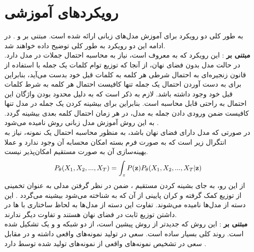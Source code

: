 \section{رویکردهای آموزشی}
به طور کلی دو رویکرد برای آموزش مدل‌های زبانی ارائه شده است. مبتنی بر \likelihood{} و 
.
در ادامه این دو رویکرد به طور کلی توضیح داده خواهند شد.
\\
{\bf مبتنی بر \likelihood{}}:
این رویکرد که به 
معروف است، نیاز به محاسبه احتمال جملات در مدل دارد. در حالت مدل بدون فضای نهان، از آنجا که توزیع توام کلمات یک جمله با استفاده از قانون زنجیره‌ای به احتمال شرطی هر کلمه به کلمات قبل خود بدست می‌آید، بنابراین برای به دست آوردن احتمال یک جمله تنها کافیست احتمال هر کلمه به شرط کلمات قبل خود وجود داشته باشد. لازم به ذکر است که به دلیل محدود بودن واژگان این احتمال به راحتی قابل محاسبه است. بنابراین برای بیشینه کردن \likelihood{} یک جمله در مدل تنها کافیست ضمن ورودی دادن جمله به مدل، در هر زمان احتمال کلمه بعدی بیشینه گردد. به این روش آموزش مدل زبانی روش 
نامیده می‌شود \cite{teacher_force}.
\\
در صورتی که مدل دارای فضای نهان باشد، به منظور محاسبه احتمال یک نمونه، نیاز به انتگرال زیر است که به صورت فرم بسته امکان محسابه آن وجود ندارد و عملا بهینه‌سازی آن به صورت مستقیم امکان‌پذیر نیست.
\begin{align}
P_\theta(X_1, X_2, ... , X_T) = \int_z P({\bf z})P_\theta(X_1, X_2, ... , X_T|{\bf z})
\end{align}
 از این رو، به جای بشینه کردن مستقیم \likelihood{}، ضمن در نظر گرفتن مدلی به عنوان تخمینی از توزیع
 کمک گرفته و کران پایینی از آن که به  شناخته می‌شود بیشینه می‌گردد \cite{vae}. این دسته از مدل‌ها 
نامیده می‌شوند. تفاوت این دسته از مدل‌ها به لحاظ ساختاری با 
ها
در داشتن توزیع ثابت در فضای نهان هستند و تفاوت دیگر ندارند.
\\
{\bf مبتنی بر \gan{}}: 
این روش که جدید‌تر از روش پیشین است، از دو شبکه \generator{} و 
 و یک \minmaxgame{} تشکیل شده است. روند کلی بسیار ساده است. \generator{} سعی در تولید نمونه‌های واقعی داشته و در مقابل \discriminator{} سعی در تشخیص نمونه‌های واقعی از نمونه‌های تولید شده توسط \generator{} دارد \cite{gan}. 
 \\
